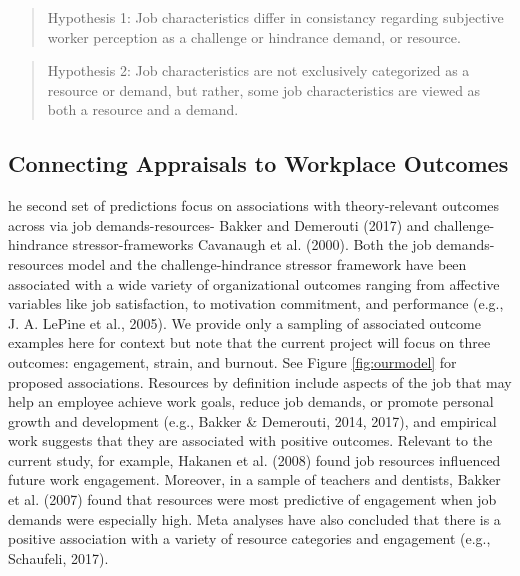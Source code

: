 \documentclass[
  man]{apa7}
\begin{document}
\begin{quote}
Hypothesis 1: Job characteristics differ in consistancy regarding subjective worker perception as a challenge or hindrance demand, or resource.
\end{quote}

\begin{quote}
Hypothesis 2: Job characteristics are not exclusively categorized as a resource or demand, but rather, some job characteristics are viewed as both a resource and a demand.
\end{quote}

\subsection{Connecting Appraisals to Workplace Outcomes}\label{connecting-appraisals-to-workplace-outcomes}

he second set of predictions focus on associations with theory-relevant outcomes across via job demands-resources- Bakker and Demerouti (2017) and challenge-hindrance stressor-frameworks Cavanaugh et al. (2000). Both the job demands-resources model and the challenge-hindrance stressor framework have been associated with a wide variety of organizational outcomes ranging from affective variables like job satisfaction, to motivation commitment, and performance (e.g., J. A. LePine et al., 2005). We provide only a sampling of associated outcome examples here for context but note that the current project will focus on three outcomes: engagement, strain, and burnout. See Figure \ref{fig:ourmodel} for proposed associations. Resources by definition include aspects of the job that may help an employee achieve work goals, reduce job demands, or promote personal growth and development (e.g., Bakker \& Demerouti, 2014, 2017), and empirical work suggests that they are associated with positive outcomes. Relevant to the current study, for example, Hakanen et al. (2008) found job resources influenced future work engagement. Moreover, in a sample of teachers and dentists, Bakker et al. (2007) found that resources were most predictive of engagement when job demands were especially high. Meta analyses have also concluded that there is a positive association with a variety of resource categories and engagement (e.g., Schaufeli, 2017).
\end{document}
